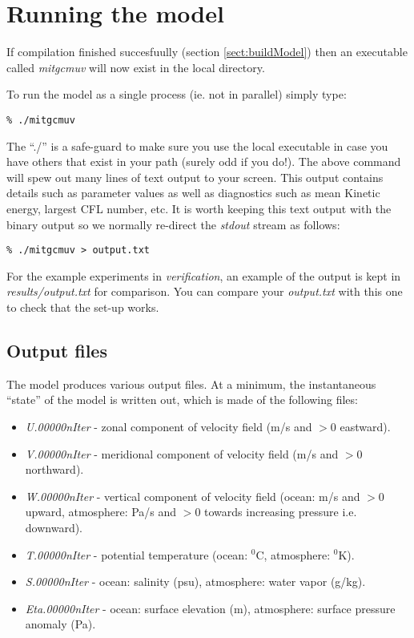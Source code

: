 \section{Running the model}
\label{sect:runModel}

If compilation finished succesfuully (section \ref{sect:buildModel})
then an executable called {\em mitgcmuv} will now exist in the local
directory.

To run the model as a single process (ie. not in parallel) simply
type:
\begin{verbatim}
% ./mitgcmuv
\end{verbatim}
The ``./'' is a safe-guard to make sure you use the local executable
in case you have others that exist in your path (surely odd if you
do!). The above command will spew out many lines of text output to
your screen.  This output contains details such as parameter values as
well as diagnostics such as mean Kinetic energy, largest CFL number,
etc. It is worth keeping this text output with the binary output so we
normally re-direct the {\em stdout} stream as follows:
\begin{verbatim}
% ./mitgcmuv > output.txt
\end{verbatim}

For the example experiments in {\em verification}, an example of the
output is kept in {\em results/output.txt} for comparison. You can compare
your {\em output.txt} with this one to check that the set-up works.



\subsection{Output files}

The model produces various output files. At a minimum, the instantaneous
``state'' of the model is written out, which is made of the following files:

\begin{itemize}
\item \textit{U.00000nIter} - zonal component of velocity field (m/s and $>
0 $ eastward).

\item \textit{V.00000nIter} - meridional component of velocity field (m/s
and $> 0$ northward).

\item \textit{W.00000nIter} - vertical component of velocity field (ocean:
m/s and $> 0$ upward, atmosphere: Pa/s and $> 0$ towards increasing pressure
i.e. downward).

\item \textit{T.00000nIter} - potential temperature (ocean: $^{0}$C,
atmosphere: $^{0}$K).

\item \textit{S.00000nIter} - ocean: salinity (psu), atmosphere: water vapor
(g/kg).

\item \textit{Eta.00000nIter} - ocean: surface elevation (m), atmosphere:
surface pressure anomaly (Pa).
\end{itemize}

